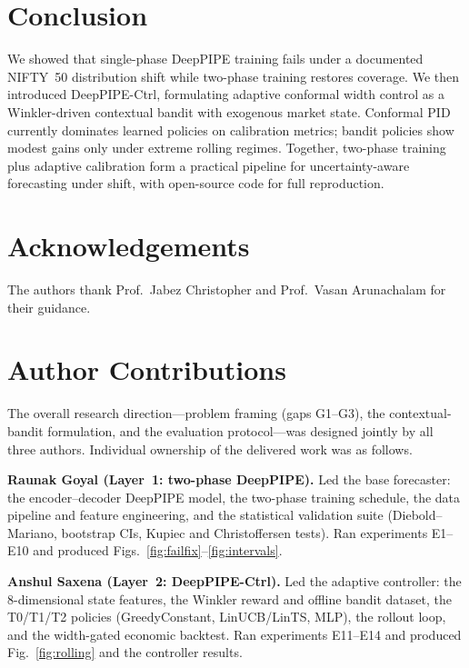 \documentclass[conference]{IEEEtran}
\begin{document}
\section{Conclusion}
\label{sec:conclusion}
We showed that single-phase DeepPIPE training fails under a documented NIFTY~50 distribution shift
while two-phase training restores coverage. We then introduced DeepPIPE-Ctrl, formulating adaptive
conformal width control as a Winkler-driven contextual bandit with exogenous market state.
Conformal PID currently dominates learned policies on calibration metrics; bandit policies show
modest gains only under extreme rolling regimes. Together, two-phase training plus adaptive
calibration form a practical pipeline for uncertainty-aware forecasting under shift, with
open-source code for full reproduction.

\section*{Acknowledgements}
The authors thank Prof.\ Jabez Christopher and Prof.\ Vasan Arunachalam for their guidance.

\section*{Author Contributions}
The overall research direction---problem framing (gaps G1--G3), the contextual-bandit
formulation, and the evaluation protocol---was designed jointly by all three authors. Individual
ownership of the delivered work was as follows.

\textbf{Raunak Goyal (Layer~1: two-phase DeepPIPE).} Led the base forecaster: the encoder--decoder
DeepPIPE model, the two-phase training schedule, the data pipeline and feature engineering, and
the statistical validation suite (Diebold--Mariano, bootstrap CIs, Kupiec and Christoffersen
tests). Ran experiments E1--E10 and produced Figs.~\ref{fig:failfix}--\ref{fig:intervals}.

\textbf{Anshul Saxena (Layer~2: DeepPIPE-Ctrl).} Led the adaptive controller: the 8-dimensional
state features, the Winkler reward and offline bandit dataset, the T0/T1/T2 policies
(GreedyConstant, LinUCB/LinTS, MLP), the rollout loop, and the width-gated economic backtest.
Ran experiments E11--E14 and produced Fig.~\ref{fig:rolling} and the controller results.
\end{document}
